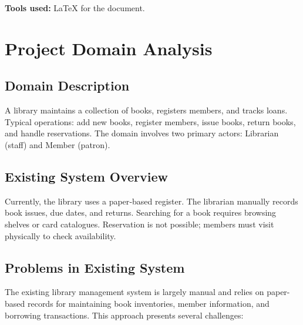 \documentclass[11pt,a4paper]{article}
\begin{document}
\textbf{Tools used:} \LaTeX{} for the document.


\section{Project Domain Analysis}

\subsection{Domain Description}
A library maintains a collection of books, registers members, and tracks loans. Typical operations: add new books, register members, issue books, return books, and handle reservations. The domain involves two primary actors: Librarian (staff) and Member (patron).

\subsection{Existing System Overview}
Currently, the library uses a paper‑based register. The librarian manually records book issues, due dates, and returns. Searching for a book requires browsing shelves or card catalogues. Reservation is not possible; members must visit physically to check availability.

\subsection{Problems in Existing System}

The existing library management system is largely manual and relies on paper-based records for maintaining book inventories, member information, and borrowing transactions. This approach presents several challenges:
\end{document}
